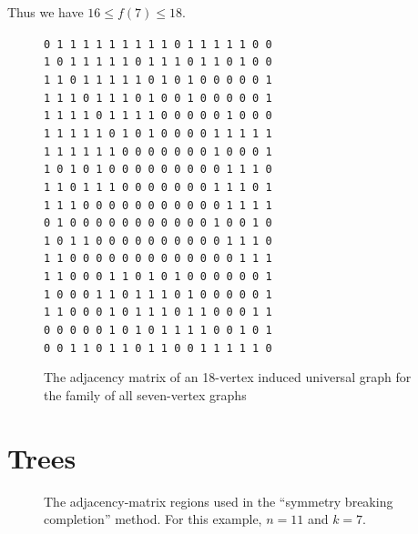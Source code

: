 \documentclass[12pt]{article}
\begin{document}
Thus we have $16 \leq f(7) \leq 18$.

\begin{figure}[htb]
\centering
\scriptsize
\verb|0 1 1 1 1 1 1 1 1 1 0 1 1 1 1 1 0 0| \\
\verb|1 0 1 1 1 1 1 0 1 1 1 0 1 1 0 1 0 0| \\
\verb|1 1 0 1 1 1 1 1 0 1 0 1 0 0 0 0 0 1| \\
\verb|1 1 1 0 1 1 1 0 1 0 0 1 0 0 0 0 0 1| \\
\verb|1 1 1 1 0 1 1 1 1 0 0 0 0 0 1 0 0 0| \\
\verb|1 1 1 1 1 0 1 0 1 0 0 0 0 1 1 1 1 1| \\
\verb|1 1 1 1 1 1 0 0 0 0 0 0 0 1 0 0 0 1| \\
\verb|1 0 1 0 1 0 0 0 0 0 0 0 0 0 1 1 1 0| \\
\verb|1 1 0 1 1 1 0 0 0 0 0 0 0 1 1 1 0 1| \\
\verb|1 1 1 0 0 0 0 0 0 0 0 0 0 0 1 1 1 1| \\
\verb|0 1 0 0 0 0 0 0 0 0 0 0 0 1 0 0 1 0| \\
\verb|1 0 1 1 0 0 0 0 0 0 0 0 0 0 1 1 1 0| \\
\verb|1 1 0 0 0 0 0 0 0 0 0 0 0 0 0 1 1 1| \\
\verb|1 1 0 0 0 1 1 0 1 0 1 0 0 0 0 0 0 1| \\
\verb|1 0 0 0 1 1 0 1 1 1 0 1 0 0 0 0 0 1| \\
\verb|1 1 0 0 0 1 0 1 1 1 0 1 1 0 0 0 1 1| \\
\verb|0 0 0 0 0 1 0 1 0 1 1 1 1 0 0 1 0 1| \\
\verb|0 0 1 1 0 1 1 0 1 1 0 0 1 1 1 1 1 0|
\caption{The adjacency matrix of an 18-vertex induced universal graph for the family of all
seven-vertex graphs}
\label{fig:adjmat18}
\end{figure}

\section{Trees}\label{sec:trees}

\begin{figure}[h!]
    \centering
    \footnotesize
    \caption{The adjacency-matrix regions used in the 
        ``symmetry breaking completion'' method. For this example, $n=11$ and $k=7$.}
\label{fig:regions-for-trees}
\end{figure}
\end{document}
